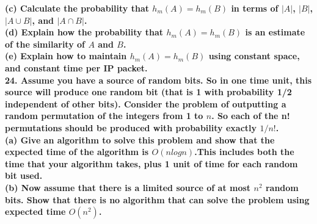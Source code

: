 \documentclass{article}
\begin{document}
\textbf{(c) Calculate the probability that $h_m(A) = h_m(B)$ in terms of $|A|$, $|B|$, $|A\cup B|$, and $|A\cap B|$.}\\ \newline
\textbf{(d) Explain how the probability that $h_m(A) = h_m(B)$ is an estimate of the similarity of $A$ and $B$.} \\ \newline
\textbf{(e) Explain how to maintain $h_m(A) = h_m(B)$ using constant space, and constant time per IP packet.} \\ \newline
\textbf{24. Assume you have a source of random bits. So in one time unit, this source will produce one random bit (that is 1 with probability 1/2 independent of other bits). Consider the problem of outputting a random permutation of the integers from 1 to $n$. So each of the n! permutations should be produced with probability exactly $1/n!$.} \\ \newline
\textbf{(a) Give an algorithm to solve this problem and show that the expected time of the algorithm is $O(nlogn)$.This includes both the time that your algorithm takes, plus 1 unit of time for each random bit used.} \\ \newline
\textbf{(b) Now assume that there is a limited source of at most $n^2$ random bits. Show that there is no algorithm that can solve the problem using expected time $O(n^2)$.}
\end{document}
